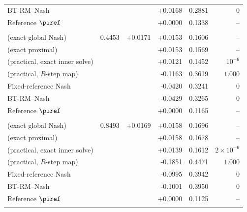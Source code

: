 \begin{tabular}{l r r r r r}
\quad BT-RM--Nash &  &  & +0.0168 & 0.2881 & $0$ \\
\quad Reference $\piref$ &  &  & +0.0000 & 0.1338 & -- \\
\addlinespace
\multicolumn{6}{l}{\textit{$\alpha=0.75$}} \\
\quad \NBPO{} (exact global Nash) & 0.4453 & +0.0171 & +0.0153 & 0.1606 & -- \\
\quad \NBPO{} (exact proximal) &  &  & +0.0153 & 0.1569 & -- \\
\quad \NBPO{} (practical, exact inner solve) &  &  & +0.0121 & 0.1452 & $10^{-6}$ \\
\quad \NBPO{} (practical, $R$-step map) &  &  & -0.1163 & 0.3619 & $1.000$ \\
\quad Fixed-reference Nash &  &  & -0.0420 & 0.3241 & $0$ \\
\quad BT-RM--Nash &  &  & -0.0429 & 0.3265 & $0$ \\
\quad Reference $\piref$ &  &  & +0.0000 & 0.1165 & -- \\
\addlinespace
\multicolumn{6}{l}{\textit{$\alpha=1.00$}} \\
\quad \NBPO{} (exact global Nash) & 0.8493 & +0.0169 & +0.0158 & 0.1696 & -- \\
\quad \NBPO{} (exact proximal) &  &  & +0.0158 & 0.1678 & -- \\
\quad \NBPO{} (practical, exact inner solve) &  &  & +0.0139 & 0.1612 & $2\!\times\!10^{-6}$ \\
\quad \NBPO{} (practical, $R$-step map) &  &  & -0.1851 & 0.4471 & $1.000$ \\
\quad Fixed-reference Nash &  &  & -0.0995 & 0.3942 & $0$ \\
\quad BT-RM--Nash &  &  & -0.1001 & 0.3950 & $0$ \\
\quad Reference $\piref$ &  &  & +0.0000 & 0.1125 & -- \\
\addlinespace
\bottomrule
\end{tabular}
